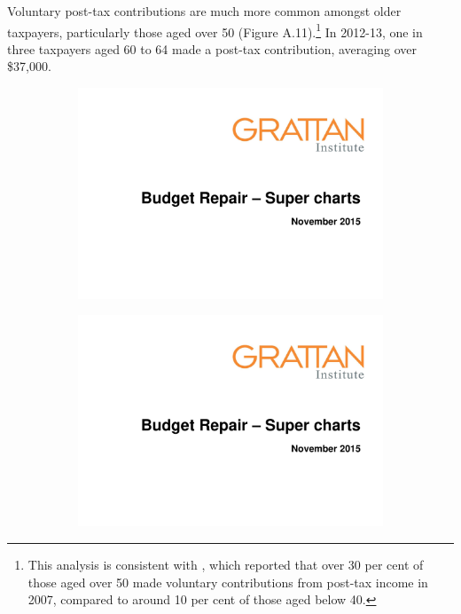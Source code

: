 \documentclass{grattanAlpha}
\begin{document}
 
Voluntary post-tax contributions are much more common amongst older taxpayers, particularly those aged over 50 (Figure A.11).\footnote{This analysis is consistent with \textcite[][16]{FengGerransClark2014}, which reported that over 30 per cent of those aged over 50 made voluntary contributions from post-tax income in 2007, compared to around 10 per cent of those aged below 40.}  In 2012-13, one in three taxpayers aged 60 to 64 made a post-tax contribution, averaging over \$37,000. 

\addtocounter{figure}{-1}

\begin{figure}
\caption{Who is more likely to make larger post-tax contributions\label{fig:SUPER-A-11--12}}%
\begin{subfigure}{\columnwidth}
\includegraphics[width=\columnwidth,page=45]{super-atlas/PPTX.pdf}
\end{subfigure}
\hfill
\begin{subfigure}{\columnwidth}
\includegraphics[width=\columnwidth,page=46]{super-atlas/PPTX.pdf}
\end{subfigure}


\end{figure}
\end{document}
